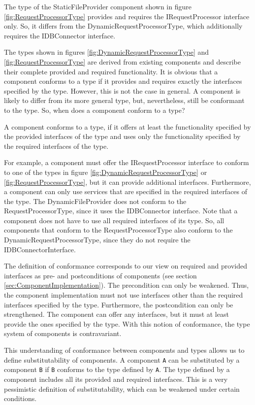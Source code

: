 The type of the StaticFileProvider component shown in figure \ref{fig:RequestProcessorType} provides and requires the IRequestProcessor interface only. So, it differs from the DynamicRequestProcessorType, which additionally requires the IDBConnector interface. 

The types shown in figures \ref{fig:DynamicRequestProcessorType} and \ref{fig:RequestProcessorType} are derived from existing components and describe their complete provided and required functionality.
It is obvious that a component conforms to a type if it provides and requires exactly the interfaces specified by the type. However, this is not the case in general. A component is likely to differ from its more general type, but, nevertheless, still be conformant to the type. So, when does a component conform to a type?

A component conforms to a type, if it offers at least the functionality specified by the provided interfaces of the type and uses only the functionality specified by the required interfaces of the type.

For example, a component must offer the IRequestProcessor interface to conform to one of the types in figure \ref{fig:DynamicRequestProcessorType} or \ref{fig:RequestProcessorType}, but it can provide additional interfaces.
Furthermore, a component can only use services that are specified in the required interfaces of the type. The DynamicFileProvider does not conform to the RequestProcessorType, since it uses the IDBConnector interface. Note that a component does not have to use all required interfaces of its type. So, all components that conform to the RequestProcessorType also conform to the DynamicRequestProcessorType, since they do not require the IDBConnectorInterface. 

The definition of conformance corresponds to our view on required and provided interfaces as pre- and postconditions of components (see section \ref{sec:ComponentImplementation}). The precondition can only be weakened. Thus, the component implementation must not use interfaces other than the required interfaces specified by the type. Furthermore, the postcondition can only be strengthened. The component can offer any interfaces, but it must at least provide the ones specified by the type. With this notion of conformance, the type system of components is contravariant.

This understanding of conformance between components and types allows us to define substitutability of components. A component \texttt{A} can be substituted by a component \texttt{B} if \texttt{B} conforms to the type defined by \texttt{A}. The type defined by a component includes all its provided and required interfaces. This is a very pessimistic definition of substitutability, which can be weakened under certain conditions. 

